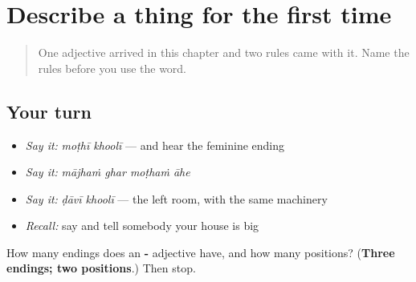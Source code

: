 \section[\texorpdfstring{\mr{मोठा} · \mr{मोठी} · \mr{मोठं} (moṭhā · moṭhī …)}{मोठा · मोठी · मोठं (moṭhā · moṭhī …)}]{Describe a thing for the first time}

\label{lesson:MR-R49-big}



\begin{quote}
One adjective arrived in this chapter and two rules came with it. Name the rules before you use the word.
\end{quote}

\subsection*{Your turn}
\begin{itemize}
\raggedright
  \item \emph{Say it:} \emph{moṭhī khoolī} — and hear the feminine ending
  \item \emph{Say it:} \emph{mājhaṁ ghar moṭhaṁ āhe}
  \item \emph{Say it:} \emph{ḍāvī khoolī} — the left room, with the same machinery
  \item \emph{Recall:} say \textbf{} and tell somebody your house is big
\end{itemize}

\begin{tcolorbox}[breakable,colback=teal!4,colframe=teal!35!black,title={Before you move on}]
How many endings does an \textbf{-} adjective have, and how many positions? (\textbf{Three endings; two positions}.) Then stop.
\end{tcolorbox}
